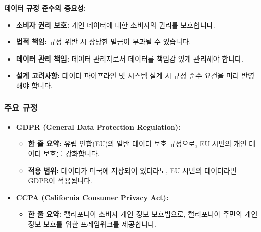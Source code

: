 \documentclass[11pt,a4paper]{article}
\begin{document}
\begin{summarybox}
\textbf{데이터 규정 준수의 중요성:}
\begin{itemize}
    \item \textbf{소비자 권리 보호:} 개인 데이터에 대한 소비자의 권리를 보호합니다.
    \item \textbf{법적 책임:} 규정 위반 시 상당한 벌금이 부과될 수 있습니다.
    \item \textbf{데이터 관리 책임:} 데이터 관리자로서 데이터를 책임감 있게 관리해야 합니다.
    \item \textbf{설계 고려사항:} 데이터 파이프라인 및 시스템 설계 시 규정 준수 요건을 미리 반영해야 합니다.
\end{itemize}
\end{summarybox}

\subsubsection{주요 규정}
\begin{itemize}
    \item \textbf{GDPR (General Data Protection Regulation):}
    \begin{itemize}
        \item \textbf{한 줄 요약:} 유럽 연합(EU)의 일반 데이터 보호 규정으로, EU 시민의 개인 데이터 보호를 강화합니다.
        \item \textbf{적용 범위:} 데이터가 미국에 저장되어 있더라도, EU 시민의 데이터라면 GDPR이 적용됩니다.
    \end{itemize}
    \item \textbf{CCPA (California Consumer Privacy Act):}
    \begin{itemize}
        \item \textbf{한 줄 요약:} 캘리포니아 소비자 개인 정보 보호법으로, 캘리포니아 주민의 개인 정보 보호를 위한 프레임워크를 제공합니다.
    \end{itemize}
\end{itemize}
\end{document}
